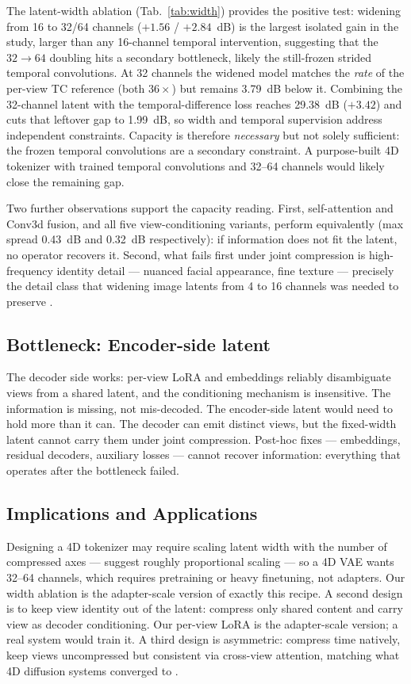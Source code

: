 The latent-width ablation (Tab.~\ref{tab:width}) provides the positive test: widening from 16 to 32/64 channels (${+}1.56$ / ${+}2.84$~dB) is the largest isolated gain in the study, larger than any 16-channel temporal intervention, suggesting that the $32{\to}64$ doubling hits a secondary bottleneck, likely the still-frozen strided temporal convolutions. At 32 channels the widened model matches the \emph{rate} of the per-view TC reference (both $36\times$) but remains 3.79~dB below it. Combining the 32-channel latent with the temporal-difference loss reaches 29.38~dB (${+}3.42$) and cuts that leftover gap to 1.99~dB, so width and temporal supervision address independent constraints. Capacity is therefore \emph{necessary} but not solely sufficient: the frozen temporal convolutions are a secondary constraint. A purpose-built 4D tokenizer with trained temporal convolutions and 32--64 channels would likely close the remaining gap.

Two further observations support the capacity reading. First, self-attention and Conv3d fusion, and all five view-conditioning variants, perform equivalently (max spread 0.43~dB and 0.32~dB respectively): if information does not fit the latent, no operator recovers it. Second, what fails first under joint compression is high-frequency identity detail --- nuanced facial appearance, fine texture --- precisely the detail class that widening image latents from 4 to 16 channels was needed to preserve \cite{dai2023emu}.

\subsection{Bottleneck: Encoder-side latent}

The decoder side works: per-view LoRA and embeddings reliably disambiguate views from a shared latent, and the conditioning mechanism is insensitive. The information is missing, not mis-decoded. The encoder-side latent would need to hold more than it can. The decoder can emit distinct views, but the fixed-width latent cannot carry them under joint compression. Post-hoc fixes --- embeddings, residual decoders, auxiliary losses --- cannot recover information: everything that operates after the bottleneck failed.

\subsection{Implications and Applications}

Designing a 4D tokenizer may require scaling latent width with the number of compressed axes --- \cite{chen2024deep, hacohen2024ltx} suggest roughly proportional scaling --- so a 4D VAE wants 32--64 channels, which requires pretraining or heavy finetuning, not adapters. Our width ablation is the adapter-scale version of exactly this recipe. A second design is to keep view identity out of the latent: compress only shared content and carry view as decoder conditioning. Our per-view LoRA is the adapter-scale version; a real system would train it. A third design is asymmetric: compress time natively, keep views uncompressed but consistent via cross-view attention, matching what 4D diffusion systems converged to \cite{xie2024sv4d, shao2024human4dit}.


